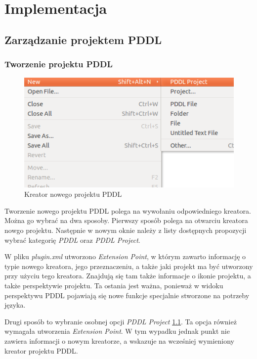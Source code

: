 \chapter{Implementacja}
\label{sec:implementacja}
\section{Zarządzanie projektem PDDL}
\label{sec:zarzadzanie}
\subsection{Tworzenie projektu PDDL}
\begin{figure}[h]
  \centering
    \includegraphics[width=12cm,keepaspectratio]{img/new-project.png}
    \caption{Kreator nowego projektu PDDL}
    \label{fig:impl:new-project}
\end{figure}
Tworzenie nowego projektu PDDL polega na wywołaniu odpowiedniego kreatora. Moż\-na go wybrać na dwa sposoby. Pierwszy sposób polega na otwarciu kreatora nowgo projektu. Następnie w nowym oknie należy z listy dostępnych propozycji wybrać kategorię \emph{PDDL} oraz \emph{PDDL Project}. 

W pliku \emph{plugin.xml} utworzono \emph{Extension Point}, w którym zawarto informację o typie nowego kreatora, jego przeznaczeniu, a także jaki projekt ma być utworzony przy użyciu tego kreatora. Znajdują się tam także informacje o ikonie projektu, a także perspektywie projektu. Ta ostania jest ważna, ponieważ w widoku perspektywu PDDL pojawiają się nowe funkcje specjalnie stworzone na potrzeby języka. 

Drugi sposób to wybranie osobnej opcji \emph{PDDL Project} \ref{fig:impl:new-project}. Ta opcja również wymagała utworzenia \emph{Extension Point}. W tym wypadku jednak punkt nie zawiera informacji o nowym kreatorze, a wskazuje na wcześniej wymieniony kreator projektu PDDL.

